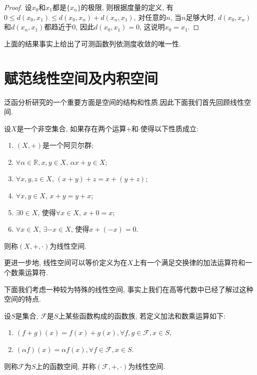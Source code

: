 \documentclass[theorem=false,mathfont=none,openany,sub3section]{easybook}
\begin{document}
\begin{proof}
  设$x_0$和$x_1$都是$\{x_n\}$的极限, 则根据度量的定义, 有$0\leqslant d(x_0,x_1)\leqslant d(x_0,x_n) + d(x_n,x_1)$, 对任意的$n$, 当$n$足够大时, $d(x_0,x_n)$和$d(x_n,x_1)$都趋近于0, 因此$d(x_0,x_1) = 0$, 这说明$x_0 = x_1$.\par
\end{proof}

\begin{remark}
  上面的结果事实上给出了可测函数列依测度收敛的唯一性.\par
\end{remark}

\newpage

\section{赋范线性空间及内积空间}

泛函分析研究的一个重要方面是空间的结构和性质,因此下面我们首先回顾线性空间.\par

\begin{definition}
  设$X$是一个非空集合, 如果存在两个运算$+$和$\cdot$使得以下性质成立:\par
  \begin{enumerate}
    \item $(X,+)$是一个阿贝尔群;
    \item $\forall \alpha \in \mathbb{R}, x,y \in X$, $\alpha x + y \in X$;
    \item $\forall x,y,z \in X$, $(x+y)+z = x+(y+z)$;
    \item $\forall x,y \in X$, $x+y = y+x$;
    \item $\exists 0 \in X$, 使得$\forall x \in X$, $x+0 = x$;
    \item $\forall x \in X$, $\exists -x \in X$, 使得$x + (-x) = 0$.
  \end{enumerate}
  则称$(X,+,\cdot)$为线性空间.\par
\end{definition}

\begin{remark}
  更进一步地, 线性空间可以等价定义为在$X$上有一个满足交换律的加法运算符和一个数乘运算符.\par
\end{remark}

下面我们考虑一种较为特殊的线性空间, 事实上我们在高等代数中已经了解过这种空间的特点.\par

\begin{definition}
  设$S$是集合, $\mathcal{F}$是$S$上某些函数构成的函数族, 若定义加法和数乘运算如下:\par
  \begin{enumerate}
    \item $(f+g)(x) = f(x) + g(x), \forall f,g \in \mathcal{F}, x \in S$,
    \item $(\alpha f)(x) = \alpha f(x), \forall f \in \mathcal{F}, x \in S$.
  \end{enumerate}
  则称$\mathcal{F}$为$S$上的函数空间, 并称$(\mathcal{F}, +, \cdot)$为线性空间.\par
\end{definition}
\end{document}
